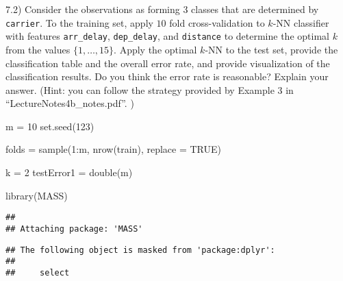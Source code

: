\documentclass[
  11pt,
]{article}
\newenvironment{Shaded}{\begin{snugshade}}{\end{snugshade}}
\newcommand{\AttributeTok}[1]{\textcolor[rgb]{0.77,0.63,0.00}{#1}}
\newcommand{\ConstantTok}[1]{\textcolor[rgb]{0.00,0.00,0.00}{#1}}
\newcommand{\DecValTok}[1]{\textcolor[rgb]{0.00,0.00,0.81}{#1}}
\newcommand{\FunctionTok}[1]{\textcolor[rgb]{0.00,0.00,0.00}{#1}}
\newcommand{\NormalTok}[1]{#1}
\newcommand{\OtherTok}[1]{\textcolor[rgb]{0.56,0.35,0.01}{#1}}
\newcommand{\SpecialCharTok}[1]{\textcolor[rgb]{0.00,0.00,0.00}{#1}}
\begin{document}
7.2) Consider the observations as forming 3 classes that are determined
by \texttt{carrier}. To the training set, apply \(10\) fold
cross-validation to \(k\)-NN classifier with features
\texttt{arr\_delay}, \texttt{dep\_delay}, and \texttt{distance} to
determine the optimal \(k\) from the values \(\{1,\ldots,15\}\). Apply
the optimal \(k\)-NN to the test set, provide the classification table
and the overall error rate, and provide visualization of the
classification results. Do you think the error rate is reasonable?
Explain your answer. (Hint: you can follow the strategy provided by
Example 3 in ``LectureNotes4b\_notes.pdf''. )

\begin{Shaded}
\begin{Highlighting}[]
\NormalTok{m }\OtherTok{=} \DecValTok{10}
\FunctionTok{set.seed}\NormalTok{(}\DecValTok{123}\NormalTok{)}

\NormalTok{folds }\OtherTok{=} \FunctionTok{sample}\NormalTok{(}\DecValTok{1}\SpecialCharTok{:}\NormalTok{m, }\FunctionTok{nrow}\NormalTok{(train), }\AttributeTok{replace =} \ConstantTok{TRUE}\NormalTok{)}

\NormalTok{k }\OtherTok{=} \DecValTok{2}
\NormalTok{testError1 }\OtherTok{=} \FunctionTok{double}\NormalTok{(m)}

\FunctionTok{library}\NormalTok{(MASS)}
\end{Highlighting}
\end{Shaded}

\begin{verbatim}
## 
## Attaching package: 'MASS'
\end{verbatim}

\begin{verbatim}
## The following object is masked from 'package:dplyr':
## 
##     select
\end{verbatim}
\end{document}
